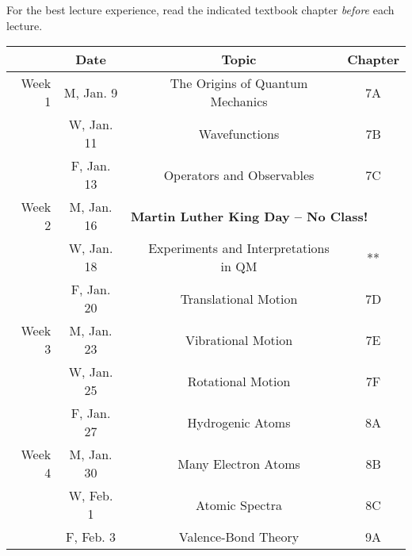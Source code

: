\documentclass[12pt, letterpaper]{article}
\begin{document}
\noindent For the best lecture experience, read the indicated textbook chapter \emph{before} each lecture.

\begin{tabular}{rcccc}
& Date && Topic & Chapter\\
\midrule
Week 1 & M, Jan. 9&& The Origins of Quantum Mechanics & 7A\\
& W, Jan. 11&& Wavefunctions & 7B\\
& F, Jan. 13&& Operators and Observables & 7C\\
\midrule
Week 2 & M, Jan. 16& \multicolumn{3}{l}{\textbf{Martin Luther King Day -- No Class!}}\\
& W, Jan. 18&& Experiments and Interpretations in QM & **\\
& F, Jan. 20&& Translational Motion & 7D\\
\midrule
Week 3 & M, Jan. 23&& Vibrational Motion & 7E\\
& W, Jan. 25&& Rotational Motion & 7F\\
& F, Jan. 27&& Hydrogenic Atoms & 8A\\
\midrule
Week 4 & M, Jan. 30&& Many Electron Atoms & 8B\\
& W, Feb. 1&& Atomic Spectra & 8C\\
& F, Feb. 3&& Valence-Bond Theory & 9A\\
\end{tabular}
\end{document}
